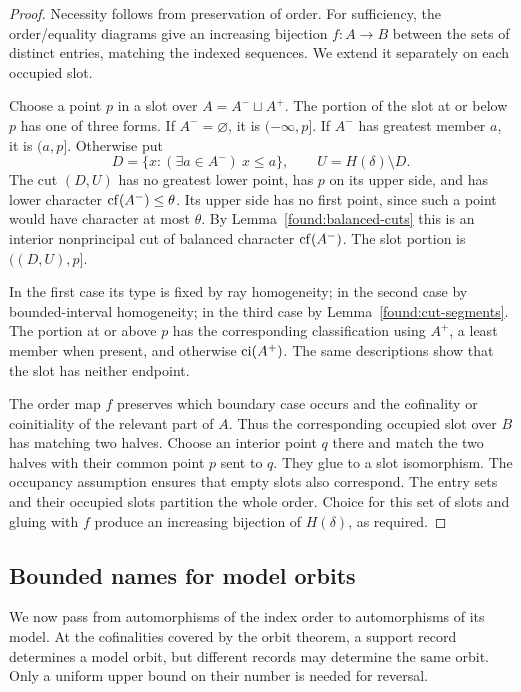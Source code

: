 \begin{proof}
Necessity follows from preservation of order. For sufficiency,
the order/equality diagrams give an increasing bijection
$f:A\longrightarrow B$ between the sets of distinct entries,
matching the indexed sequences. We extend it separately on
each occupied slot.

Choose a point $p$ in a slot over $A=A^-\sqcup A^+$. The portion
of the slot at or below $p$ has one of three forms. If
$A^-=\varnothing$, it is $(-\infty,p]$. If $A^-$ has greatest
member $a$, it is $(a,p]$. Otherwise put
\[
D=\{x:(\exists a\in A^-)\ x\leq a\},\qquad U=H(\delta)\setminus D.
\]
The cut $(D,U)$ has no greatest lower point, has $p$ on its
upper side, and has lower character
$\operatorname{cf}(A^-)\leq\theta$. Its upper side has no first point,
since such a point would have character at most $\theta$.
By Lemma~\ref{found:balanced-cuts} this is an interior
nonprincipal cut of balanced character $\operatorname{cf}(A^-)$. The
slot portion is $((D,U),p]$.

In the first case its type is fixed by ray homogeneity; in the
second case by bounded-interval homogeneity; in the third case
by Lemma~\ref{found:cut-segments}. The portion at or above $p$
has the corresponding classification using $A^+$, a least
member when present, and otherwise $\operatorname{ci}(A^+)$. The same
descriptions show that the slot has neither endpoint.

The order map $f$ preserves which boundary case occurs and the
cofinality or coinitiality of the relevant part of $A$. Thus
the corresponding occupied slot over $B$ has matching two
halves. Choose an interior point $q$ there and match the two
halves with their common point $p$ sent to $q$. They glue to a
slot isomorphism. The occupancy assumption ensures that empty
slots also correspond. The entry sets and their occupied slots
partition the whole order. Choice for this set of slots and
gluing with $f$ produce an increasing bijection of
$H(\delta)$, as required.
\end{proof}

\subsection{Bounded names for model orbits}

We now pass from automorphisms of the index order to automorphisms of its
model.  At the cofinalities covered by the orbit theorem, a support record
determines a model orbit, but different records may determine the same
orbit.  Only a uniform upper bound on their number is needed for reversal.

